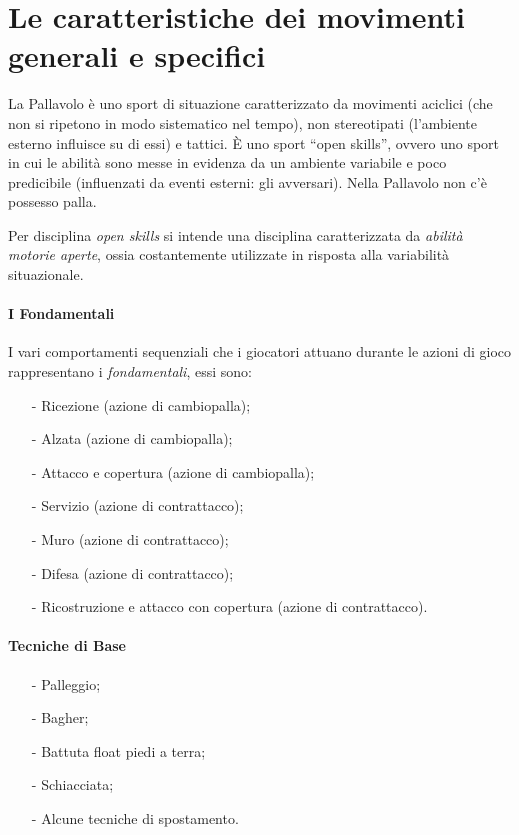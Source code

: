 \chapter{Le caratteristiche dei movimenti generali e specifici}

La Pallavolo è uno sport di situazione caratterizzato da movimenti aciclici (che
non si ripetono in modo sistematico nel tempo), non stereotipati (l'ambiente
esterno influisce su di essi) e tattici. \`E uno sport “open skills”, ovvero uno
sport in cui le abilità sono messe in evidenza da un ambiente variabile e poco
predicibile (influenzati da eventi esterni: gli avversari). Nella Pallavolo non
c'è possesso palla.

\begin{libro}
Per disciplina \emph{open skills} si intende una disciplina caratterizzata da
\emph{abilità motorie aperte}, ossia costantemente utilizzate in risposta
alla variabilità situazionale.
\end{libro}

\subsubsection{I Fondamentali}
I vari comportamenti sequenziali che i giocatori attuano durante le azioni
di gioco rappresentano i \emph{fondamentali}, essi sono:
\begin{itemize}
\item[-]Ricezione (azione di cambiopalla);
\item[-]Alzata (azione di cambiopalla);
\item[-]Attacco e copertura (azione di cambiopalla);
\item[-]Servizio (azione di contrattacco);
\item[-]Muro (azione di contrattacco);
\item[-]Difesa (azione di contrattacco);
\item[-]Ricostruzione e attacco con copertura (azione di contrattacco).
\end{itemize}

\subsubsection{Tecniche di Base}
\begin{itemize}
\item[-]Palleggio;
\item[-]Bagher;
\item[-]Battuta float piedi a terra;
\item[-]Schiacciata;
\item[-]Alcune tecniche di spostamento.
\end{itemize}



